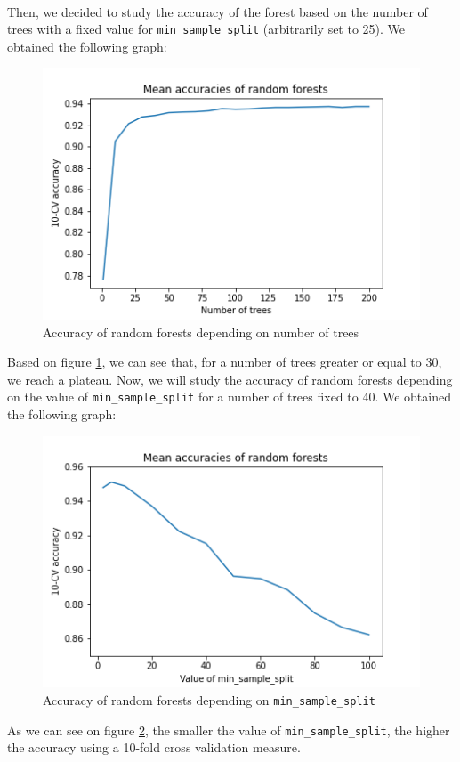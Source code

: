 \documentclass[a4paper, 11pt, oneside]{article}
\begin{document}
\paragraph{}Then, we decided to study the accuracy of the forest based on the number of trees with a fixed value for \texttt{min\_sample\_split} (arbitrarily set to 25). We obtained the following graph:\newpage
\begin{figure}[H]
\centering
\includegraphics[scale=0.4]{rf/rf_basic_accuracies.png}
\caption{Accuracy of random forests depending on number of trees}
\label{fig:rf-acc-1}
\end{figure}
Based on figure \ref{fig:rf-acc-1}, we can see that, for a number of trees greater or equal to 30, we reach a plateau. Now, we will study the accuracy of random forests depending on the value of \texttt{min\_sample\_split} for a number of trees fixed to 40. We obtained the following graph:
\begin{figure}[H]
\centering
\includegraphics[scale=0.4]{rf/rf_40_accuracies.png}
\caption{Accuracy of random forests depending on \texttt{min\_sample\_split}}
\label{fig:rf-acc-2}
\end{figure}
As we can see on figure \ref{fig:rf-acc-2}, the smaller the value of \texttt{min\_sample\_split}, the higher the accuracy using a 10-fold cross validation measure.
\end{document}
